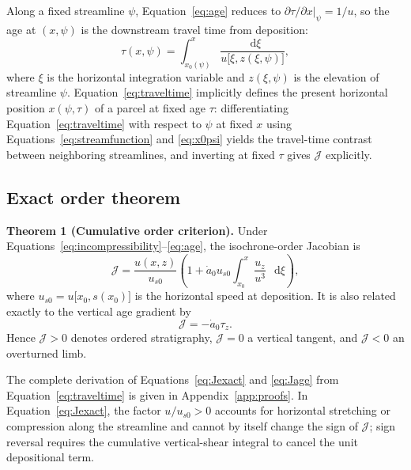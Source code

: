 \documentclass[review]{igs}
\begin{document}
Along a fixed streamline \(\psi\), Equation~\ref{eq:age} reduces to \(\left.\partial\tau/\partial x\right|_{\psi}=1/u\), so the age at \((x,\psi)\) is the downstream travel time from deposition:
\begin{equation}
\tau(x,\psi)=\int_{x_0(\psi)}^{x}
\frac{\mathop{}\!\mathrm{d}\xi}{u\bigl[\xi,z(\xi,\psi)\bigr]},
\label{eq:traveltime}
\end{equation}
where \(\xi\) is the horizontal integration variable and \(z(\xi,\psi)\) is the elevation of streamline \(\psi\). Equation~\ref{eq:traveltime} implicitly defines the present horizontal position \(x(\psi,\tau)\) of a parcel at fixed age \(\tau\): differentiating Equation~\ref{eq:traveltime} with respect to \(\psi\) at fixed \(x\) using Equations~\ref{eq:streamfunction} and \ref{eq:x0psi} yields the travel-time contrast between neighboring streamlines, and inverting at fixed \(\tau\) gives \(\mathcal{J}\) explicitly.

\subsection{Exact order theorem}

\noindent\textbf{Theorem 1 (Cumulative order criterion).}
Under Equations~\ref{eq:incompressibility}--\ref{eq:age}, the isochrone-order Jacobian is
\begin{equation}
\mathcal{J}
=\frac{u(x,z)}{u_{s0}}
\left(
1+\dot a_0u_{s0}
\int_{x_0}^{x}\frac{u_z}{u^3}\,\mathop{}\!\mathrm{d}\xi
\right),
\label{eq:Jexact}
\end{equation}
where \(u_{s0}=u\bigl[x_0,s(x_0)\bigr]\) is the horizontal speed at deposition. It is also related exactly to the vertical age gradient by
\begin{equation}
\mathcal{J}=-\dot a_0\tau_z.
\label{eq:Jage}
\end{equation}
Hence \(\mathcal{J}>0\) denotes ordered stratigraphy, \(\mathcal{J}=0\) a vertical tangent, and \(\mathcal{J}<0\) an overturned limb.

The complete derivation of Equations~\ref{eq:Jexact} and \ref{eq:Jage} from Equation~\ref{eq:traveltime} is given in Appendix~\ref{app:proofs}. In Equation~\ref{eq:Jexact}, the factor \(u/u_{s0}>0\) accounts for horizontal stretching or compression along the streamline and cannot by itself change the sign of \(\mathcal{J}\); sign reversal requires the cumulative vertical-shear integral to cancel the unit depositional term.
\end{document}
